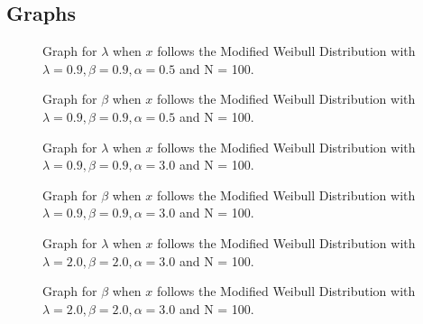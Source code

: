 \documentclass[11pt]{article}
\numberwithin{equation}{section}
\begin{document}
\pagebreak

\subsection{Graphs}

\begin{figure}[H]
	\centering
	\caption{Graph for $\lambda$ when $x$ follows the Modified Weibull Distribution with $\lambda = 0.9, \beta = 0.9, \alpha = 0.5$ and N = 100.}
	\label{fig:graph_a1}
\end{figure}
\medskip

\begin{figure}[H]
	\centering
	\caption{Graph for $\beta$ when $x$ follows the Modified Weibull Distribution with $\lambda = 0.9, \beta = 0.9, \alpha = 0.5$ and N = 100.}
	\label{fig:graph_a2}
\end{figure}
\medskip

\begin{figure}[H]
	\centering
	\caption{Graph for $\lambda$ when $x$ follows the Modified Weibull Distribution with $\lambda = 0.9, \beta = 0.9, \alpha = 3.0$ and N = 100.}
	\label{fig:graph_b1}
\end{figure}
\medskip

\begin{figure}[H]
	\centering
	\caption{Graph for $\beta$ when $x$ follows the Modified Weibull Distribution with $\lambda = 0.9, \beta = 0.9, \alpha = 3.0$ and N = 100.}
	\label{fig:graph_b2}
\end{figure}
\medskip

\begin{figure}[H]
	\centering
	\caption{Graph for $\lambda$ when $x$ follows the Modified Weibull Distribution with $\lambda = 2.0, \beta = 2.0, \alpha = 3.0$ and N = 100.}
	\label{fig:graph_c1}
\end{figure}
\medskip

\begin{figure}[H]
	\centering
	\caption{Graph for $\beta$ when $x$ follows the Modified Weibull Distribution with $\lambda = 2.0, \beta = 2.0, \alpha = 3.0$ and N = 100.}
	\label{fig:graph_c2}
\end{figure}
\medskip
\end{document}
